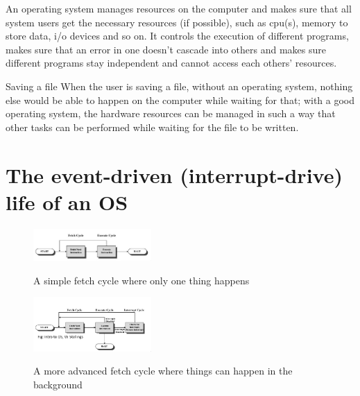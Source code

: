 An operating system manages resources on the computer and makes sure that all system users get the necessary resources (if possible), such as cpu(s), memory to store data, i/o devices and so on.
It controls the execution of different programs, makes sure that an error in one doesn't cascade into others and makes sure different programs stay independent and cannot access each others' resources.

\begin{example}{Saving a file}
	When the user is saving a file, without an operating system, nothing else would be able to happen on the computer while waiting for that; with a good operating system, the hardware resources can be managed in such a way that other tasks can be performed while waiting for the file to be written.
\end{example}

\section{The event-driven (interrupt-drive) life of an OS}
\begin{figure}[H]
	\centering
	\includegraphics[width=0.4\textwidth]{images/fetch_cycle_simple.png}
	\label{fig:simple_fetch_cycle}
	\caption{A simple fetch cycle where only one thing happens}
\end{figure}
\begin{figure}[H]
	\centering
	\includegraphics[width=0.4\textwidth]{images/fetch_cycle_advanced.png}
	\label{fig:advanced_fetch_cycle}
	\caption{A more advanced fetch cycle where things can happen in the background}
\end{figure}

